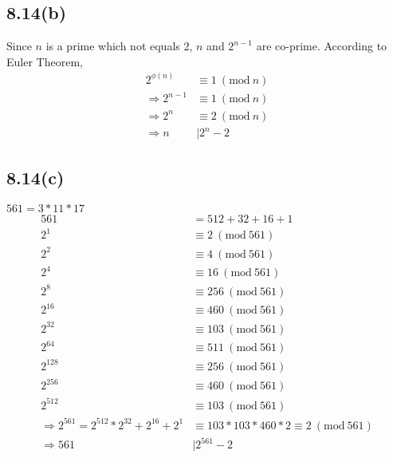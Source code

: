 \documentclass[acmlarge,screen]{acmart}
\begin{document}
\begin{CJK*}{UTF8}{gbsn}
\subsection{8.14(b)}
Since $n$ is a prime which not equals $2$, $n$ and $2^{n - 1}$ are co-prime. According to Euler Theorem,
\begin{align*}
	2^{\phi(n)}&\equiv1\ (\text{mod}\ n)\\
	\Rightarrow 2^{n-1}&\equiv1\ (\text{mod}\ n)\\
	\Rightarrow 2^n&\equiv2\ (\text{mod}\ n)\\
	\Rightarrow n&\mid 2^n-2
\end{align*}
\subsection{8.14(c)}
$561=3*11*17$
\begin{align*}
	561&=512+32+16+1\\
	2^{1}&\equiv2\ (\text{mod}\ 561)\\
	2^{2}&\equiv4\ (\text{mod}\ 561)\\
	2^{4}&\equiv16\ (\text{mod}\ 561)\\
	2^{8}&\equiv256\ (\text{mod}\ 561)\\
	2^{16}&\equiv460\ (\text{mod}\ 561)\\
	2^{32}&\equiv103\ (\text{mod}\ 561)\\	
	2^{64}&\equiv511\ (\text{mod}\ 561)\\
	2^{128}&\equiv256\ (\text{mod}\ 561)\\
	2^{256}&\equiv460\ (\text{mod}\ 561)\\
	2^{512}&\equiv103\ (\text{mod}\ 561)\\
	\Rightarrow 2^{561}=2^{512} * 2^{32} + 2^{16} + 2^{1}&\equiv103 * 103 * 460 * 2\equiv2\ (\text{mod}\ 561)\\
	\Rightarrow 561 &\mid 2^{561} - 2
\end{align*}

\end{CJK*}
\end{document}
